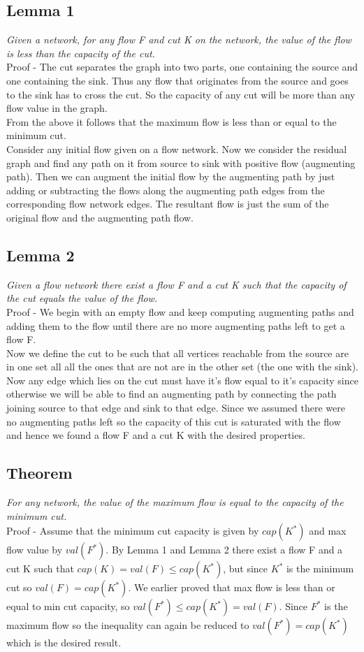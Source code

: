 \documentclass[12pt]{article}
\begin{document}
\subsection{Lemma 1}
\textit{Given a network, for any flow F and cut K on the network, the value of the flow is less than the capacity of the cut.}\\
Proof - 
The cut separates the graph into two parts, one containing the source and one containing the sink. Thus any flow that originates from the source and goes to the sink has to cross the cut. So the capacity of any cut will be more than any flow value in the graph.\\
From the above it follows that the maximum flow is less than or equal to the minimum cut.\\
Consider any initial flow given on a flow network. Now we consider the residual graph and find any path on it from source to sink with positive flow (augmenting path). Then we can augment the initial flow by the augmenting path by just adding or subtracting the flows along the augmenting path edges from the corresponding flow network edges. The resultant flow is just the sum of the original flow and the augmenting path flow.\\
\subsection{Lemma 2} \textit{Given a flow network there exist a flow F and a cut K such that the capacity of the cut equals the value of the flow.}\\

Proof - We begin with an empty flow and keep computing augmenting paths and adding them to the flow until there are no more augmenting paths left to get a flow F.\\
Now we define the cut to be such that all vertices reachable from the source are in one set all all the ones that are not are in the other set (the one with the sink). Now any edge which lies on the cut must have it's flow equal to it's capacity since otherwise we will be able to find an augmenting path by connecting the path joining source to that edge and sink to that edge. Since we assumed there were no augmenting paths left so the capacity of this cut is saturated with the flow and hence we found a flow F and a cut K with the desired properties.\\
\subsection{Theorem} \textit{For any network, the value of the maximum flow is equal to the capacity of the minimum cut.}\\
Proof -
Assume that the minimum cut capacity is given by $cap(K^*)$ and max flow value by $val(F^*)$. By Lemma 1 and Lemma 2 there exist a flow F and a cut K such that $cap(K)= val(F) \le cap(K^*)$, but since $K^*$ is the minimum cut so $val(F) = cap(K^*)$. We earlier proved that max flow is less than or equal to min cut capacity, so $val(F^*) \le cap(K^*) = val(F)$. Since $F^*$ is the maximum flow so the inequality can again be reduced to $val(F^*) = cap(K^*)$ which is the desired result. 
\end{document}
